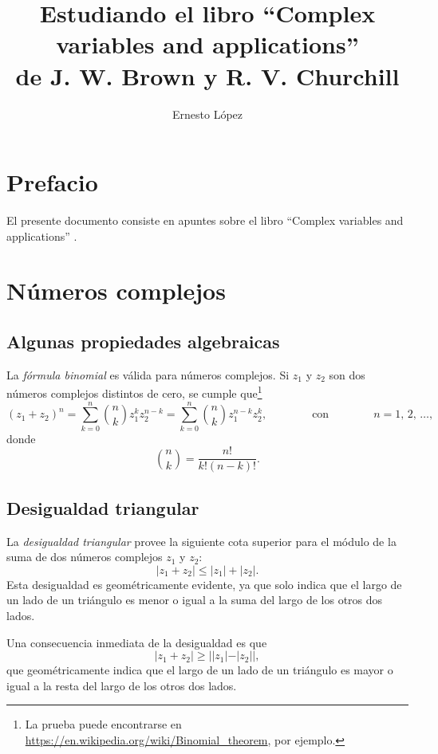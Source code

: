 \documentclass[a4paper]{report}
\title{Estudiando el libro ``Complex variables and applications''\\de J. W. Brown y R. V. Churchill}
\author{Ernesto López}
\begin{document}
 

\hypersetup{pageanchor=false}
\maketitle
\hypersetup{pageanchor=true}
\tableofcontents


\chapter*{Prefacio}

El presente documento consiste en apuntes sobre el libro ``Complex variables and applications'' \cite{brown2013complex}.


\chapter{Números complejos}

\section{Algunas propiedades algebraicas}

La \emph{fórmula binomial} es válida para números complejos. Si \(z_1\) y \(z_2\) son dos números complejos distintos de cero, se cumple que\footnote{La prueba puede encontrarse en \url{https://en.wikipedia.org/wiki/Binomial_theorem}, por ejemplo.} 
\begin{equation}\label{eq:binomial_theorem}
 (z_1+z_2)^n=\sum_{k=0}^n\binom{n}{k}z_1^{k}z_2^{n-k}=\sum_{k=0}^n\binom{n}{k}z_1^{n-k}z_2^k,
 \qquad\qquad\textrm{con}\qquad\qquad
 n=1,\,2,\,\dots,
\end{equation}
donde
\[
 \binom{n}{k}=\frac{n!}{k!(n-k)!}.
\]

\section{Desigualdad triangular}

La \emph{desigualdad triangular} provee la siguiente cota superior para el módulo de la suma de dos números complejos \(z_1\) y \(z_2\):
\[
 |z_1+z_2|\leq|z_1|+|z_2|.
\]
Esta desigualdad es geométricamente evidente, ya que solo indica que el largo de un lado de un triángulo es menor o igual a la suma del largo de los otros dos lados. 

Una consecuencia inmediata de la desigualdad es que 
\[
 |z_1+z_2|\geq||z_1|-|z_2||,
\]
que geométricamente indica que el largo de un lado de un triángulo es mayor o igual a la resta del largo de los otros dos lados.
\end{document}
